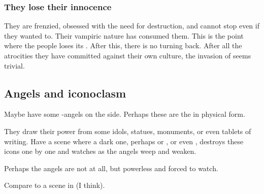 \subsubsection{They lose their innocence}
They are frenzied, obsessed with the need for destruction, and cannot stop even if they wanted to. 
Their vampiric nature has consumed them. 
This is the point where the \resphan{} people loses its . 
After this, there is no turning back. 
After all the atrocities they have committed against their own culture, the invasion of \Tembrae{} seems trivial. 










\subsection{Angels and iconoclasm}
Maybe have some \uber-angels on the \Merkyran{} side. Perhaps these are the  in physical form. 

They draw their power from some idols, statues, monuments, or even tablets of writing. Have a scene where a dark one, perhaps \Azraid{} or \Ramiel, or even \Sithiyacaan, destroys these icons one by one and watches as the angels weep and weaken. 

Perhaps the angels are not \uber{} at all, but powerless and forced to watch. 

Compare to a scene in  (I think). 


